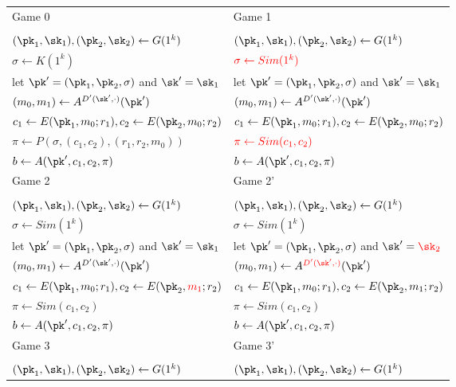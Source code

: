 \documentclass[12pt]{tufte-book}
\begin{document}
\begin{table}[t!]
\centering
\begin{tabular}{l|l}
Game 0 &
Game 1 \\
 & \\
$(\pk_1,\sk_1),(\pk_2,\sk_2) \leftarrow G(1^k)$ &
$(\pk_1,\sk_1),(\pk_2,\sk_2) \leftarrow G(1^k)$ \\
$\sigma \leftarrow {K(1^k)}$ &
$\textcolor{red}{\sigma \leftarrow {Sim(1^k)}}$ \\
let $\pk'=(\pk_1,\pk_2,\sigma)$ and $\sk'={\sk_1}$ &
let $\pk'=(\pk_1,\pk_2,\sigma)$ and $\sk'={\sk_1}$ \\
$(m_0,m_1) \leftarrow A^{D'(\sk',\cdot)}(\pk')$ &
$(m_0,m_1) \leftarrow A^{D'(\sk',\cdot)}(\pk')$ \\
$c_1 \leftarrow E(\pk_1,{m_0};r_1), c_2 \leftarrow E(\pk_2,{m_0};r_2)$ &
$c_1 \leftarrow E(\pk_1,{m_0};r_1), c_2 \leftarrow E(\pk_2,{m_0};r_2)$ \\
$\pi \leftarrow {P(\sigma,(c_1,c_2),(r_1,r_2,{m_0}))}$ &
$\textcolor{red}{\pi \leftarrow {Sim(c_1,c_2)}}$ \\
$b \leftarrow A(\pk',c_1,c_2,\pi)$ &
$b \leftarrow A(\pk',c_1,c_2,\pi)$ \\
\hline
Game 2 &
Game 2' \\
 & \\
$(\pk_1,\sk_1),(\pk_2,\sk_2) \leftarrow G(1^k)$ &
$(\pk_1,\sk_1),(\pk_2,\sk_2) \leftarrow G(1^k)$ \\
$\sigma \leftarrow {Sim(1^k)}$ &
$\sigma \leftarrow {Sim(1^k)}$ \\
let $\pk'=(\pk_1,\pk_2,\sigma)$ and $\sk'={\sk_1}$  &
let $\pk'=(\pk_1,\pk_2,\sigma)$ and $\sk'=\textcolor{red}{\sk_2}$  \\
$(m_0,m_1) \leftarrow A^{D'(\sk',\cdot)}(\pk')$ &
$(m_0,m_1) \leftarrow A^{\textcolor{red}{D'(\sk',\cdot)}}(\pk')$ \\
$c_1 \leftarrow E(\pk_1,{m_0};r_1), c_2 \leftarrow E(\pk_2,\textcolor{red}{m_1};r_2)$ &
$c_1 \leftarrow E(\pk_1,{m_0};r_1), c_2 \leftarrow E(\pk_2,{m_1};r_2)$ \\
$\pi \leftarrow {Sim(c_1,c_2)}$ &
$\pi \leftarrow {Sim(c_1,c_2)}$ \\
$b \leftarrow A(\pk',c_1,c_2,\pi)$ &
$b \leftarrow A(\pk',c_1,c_2,\pi)$ \\
\hline
Game 3 &
Game 3' \\
 & \\
$(\pk_1,\sk_1),(\pk_2,\sk_2) \leftarrow G(1^k)$ &
$(\pk_1,\sk_1),(\pk_2,\sk_2) \leftarrow G(1^k)$ \\

\end{tabular}
\end{table}
\end{document}
